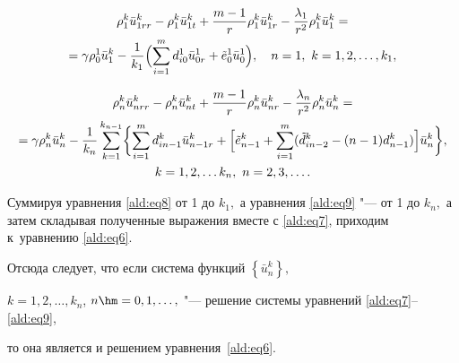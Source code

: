 \begin{multline}

\rho_1^k \bar{u}_{1rr}^{k} - \rho_1^k \bar {u}_{1t}^{k} +

\dfrac{m-1}{r} \rho_1^k \bar{u}_{1r}^{k}-

\dfrac{\lambda_1}{r^2}\rho_1^k \bar{u}_1^k =

\\ 

= \gamma \rho_0^1 \bar{u}_1^k -\dfrac{1}{k_1}

\Bigl(\sum\limits_{i=1}^m d_{i0}^1\bar{u}_{0r}^{1} +

\tilde{e}_0^1\bar{u}_{0}^1\Bigr), \quad n=1,\,\, k=1,2,\dots,k_1,

\label{ald:eq8}

\end{multline}

\begin{multline}

\rho_n^k \bar{u}_{nrr}^{k} - \rho_n^k \bar {u}_{nt}^{k} +

\dfrac{m-1}{r} \rho_n^k\bar{u}_{nr}^{k}- \dfrac{\lambda_n}{r^2}

\rho_n^k \bar{u}_n^k =

\\ 

= \gamma \rho_n^k \bar{u}_n^k -\dfrac{1}{k_n}\sum\limits_{k=1}^{k_{n-1}} 

\biggl\{\sum\limits_{i=1}^m d_{in-1}^k \bar{u}_{n-1r}^{k} +

\Bigl[\tilde{e}_{n-1}^k + \sum\limits_{i=1}^m(\tilde{d}_{in-2}^k -

(n-1)d_{n-1}^k)\Bigr]\bar{u}_{n}^k \biggr\},\\ k =1,2,\dots k_n,\,\,n = 2, 3, \dots.

\label{ald:eq9}

\end{multline}



Суммируя уравнения \eqref{ald:eq8} от 1 до $k_1,$ а уравнения \eqref{ald:eq9} "--- от 1 до $k_n,$ а затем складывая полученные выражения вместе с \eqref{ald:eq7}, приходим к~уравнению \eqref{ald:eq6}.



Отсюда следует, что если система функций $\left\{ \bar {u}_{n}^{k}\right\},$

$k=1,2, \dots, k_{n}$, $n \hm = 0,1,\dots,$ "--- решение системы уравнений \eqref{ald:eq7}--\eqref{ald:eq9},

то она является и решением уравнения~\eqref{ald:eq6}.



